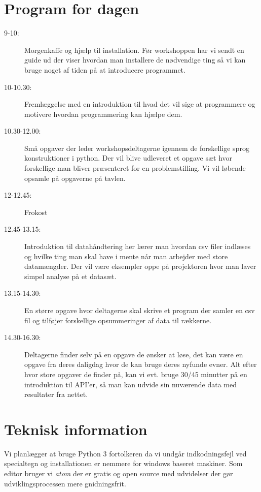\documentclass{article}
\begin{document}
\section{Program for dagen}
    \begin{description}
        \item[9-10:] Morgenkaffe og hjælp til installation. Før workshoppen
        har vi sendt en guide ud der viser hvordan man installere de nødvendige
        ting så vi kan bruge noget af tiden på at introducere programmet.

        \item[10-10.30:] Fremlæggelse med en introduktion til hvad det vil sige
        at programmere og motivere hvordan programmering kan hjælpe dem.


        \item[10.30-12.00:] Små opgaver der leder workshopsdeltagerne igennem
        de forskellige sprog konstruktioner i python. Der vil blive udleveret et
        opgave sæt hvor forskellige man bliver præsenteret for en
        problemstilling. Vi vil løbende opsamle på opgaverne på tavlen.

        \item[12-12.45:] Frokost

        \item[12.45-13.15:] Introduktion til datahåndtering her lærer man hvordan
        csv filer indlæses og hvilke ting man skal have i mente når man arbejder
        med store datamængder. Der vil være eksempler oppe på projektoren hvor
        man laver simpel analyse på et datasæt.


        \item[13.15-14.30:] En større opgave hvor deltagerne skal
        skrive et program der samler en csv fil og tilføjer forskellige
        opsummeringer af data til rækkerne.

        \item[14.30-16.30:] Deltagerne finder selv på en opgave de ønsker at
        løse, det kan være en opgave fra deres daligdag hvor de kan bruge deres
        nyfunde evner. Alt efter hvor store opgaver de finder på, kan vi evt.
        bruge 30/45 minutter på en introduktion til API'er, så man kan udvide
        sin nuværende data med resultater fra nettet.

    \end{description}

\section{Teknisk information}
    Vi planlægger at bruge Python 3 fortolkeren da vi undgår indkodningsfejl ved
    specialtegn og installationen er nemmere for windows baseret maskiner.
    Som editor bruger vi \emph{atom} der er gratis og open source med udvidelser
    der gør udviklingsprocessen mere gnidningsfrit.
\end{document}
